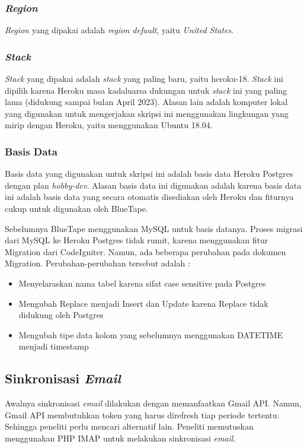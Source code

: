 	\subsubsection{\textit{Region}}
	\textit{Region} yang dipakai adalah \textit{region default}, yaitu \textit{United States}.
		
	\subsubsection{\textit{Stack}}
	\textit{Stack} yang dipakai adalah \textit{stack} yang paling baru, yaitu heroku-18. \textit{Stack} ini dipilih karena Heroku masa kadaluarsa dukungan untuk \textit{stack} ini yang paling lama (didukung sampai bulan April 2023). Alasan lain adalah komputer lokal yang digunakan untuk mengerjakan skripsi ini menggunakan lingkungan yang mirip dengan Heroku, yaitu menggunakan Ubuntu 18.04.

	\subsubsection{Basis Data}
		Basis data yang digunakan untuk skripsi ini adalah basis data Heroku Postgres dengan plan \textit{hobby-dev}. Alasan basis data ini digunakan adalah karena basis data ini adalah basis data yang secara otomatis disediakan oleh Heroku dan fiturnya cukup untuk digunakan oleh BlueTape.
	
		Sebelumnya BlueTape menggunakan MySQL untuk basis datanya. Proses migrasi dari MySQL ke Heroku Postgres tidak rumit, karena menggunakan fitur Migration dari CodeIgniter. Namun, ada beberapa perubahan pada dokumen Migration. Perubahan-perubahan tersebut adalah :
	\begin{itemize}
		\item Menyelaraskan nama tabel karena sifat case sensitive pada Postgres
		\item Mengubah Replace menjadi Insert dan Update karena Replace tidak didukung oleh Postgres
		\item Mengubah tipe data kolom yang sebelumnya menggunakan DATETIME menjadi timestamp
	\end{itemize}  

\subsection{Sinkronisasi \textit{Email}}
\label{sec:analisisemail}
	Awalnya sinkronisasi \textit{email} dilakukan dengan memanfaatkan Gmail API. Namun, Gmail API membutuhkan token yang harus direfresh tiap periode tertentu. Sehingga peneliti perlu mencari alternatif lain. Peneliti memutuskan menggunakan PHP IMAP untuk melakukan sinkronisasi \textit{email}.
	
